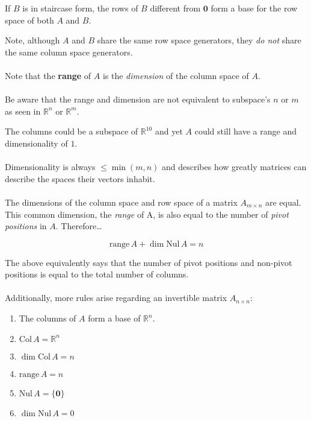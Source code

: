 \documentclass[12pt]{article}
\newcommand{\R}{\mathbb{R}}
\newcommand{\bt}[1]{\textbf{{#1}}}
\newcommand{\bm}[1]{\mathbf{{#1}}}
\newcommand{\set}[1]{\{{#1}\}}
\begin{document}
If $B$ is in staircase form, the rows of $B$ different from $\bm{0}$ form a base for the row space of both $A$ and $B$.

Note, although $A$ and $B$ share the same row space generators, they \emph{do not} share the same column space generators. \\ \\

Note that the \bt{range} of $A$ is the \emph{dimension} of the column space of $A$. \\ \\

Be aware that the range and dimension are not equivalent to subspace's $n$ or $m$ as seen in $\R^n$ or $\R^m$.

The columns could be a subspace of $\R^{10}$ and yet $A$ could still have a range and dimensionality of $1$. \\ \\

Dimensionality is always $\leq \min(m,n)$ and describes how greatly matrices can describe the spaces their vectors inhabit. \\ \\

The dimensions of the column space and row space of a matrix $A_{m\times n}$ are equal. This common dimension, the \emph{range} of A, is
also equal to the number of \emph{pivot positions} in $A$. Therefore\dots

$$\textrm{range}\, A + \dim \textrm{Nul}\, A = n$$

The above equivalently says that the number of pivot positions and non-pivot positions is equal to the total number of columns. \\ \\

Additionally, more rules arise regarding an invertible matrix $A_{n \times n}$:

\begin{enumerate}
    \item The columns of $A$ form a base of $\R^n$.
    \item $\textrm{Col}\, A = \R^n$
    \item $\dim \textrm{Col}\, A = n$
    \item $\textrm{range}\, A = n$
    \item $\textrm{Nul}\, A = \set{\bm{0}}$
    \item $\dim \textrm{Nul}\, A = 0$
\end{enumerate}
\end{document}
